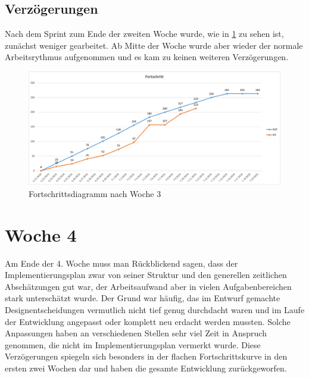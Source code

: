 \subsection{Verzögerungen}
Nach dem Sprint zum Ende der zweiten Woche wurde, wie in \ref{fig:week_three_diagram} zu sehen ist, zunächst weniger gearbeitet. Ab Mitte der Woche wurde aber wieder der normale Arbeitsrythmus aufgenommen und es kam zu keinen weiteren Verzögerungen.
\begin{figure}[!htbp]
	\centering
	\includegraphics[width=380pt]{resourcen/week_three_diagram.PNG}
	\caption{Fortschrittsdiagramm nach Woche 3}
	\label{fig:week_three_diagram}
\end{figure}
\section{Woche 4}
Am Ende der 4. Woche muss man Rückblickend sagen, dass der Implementierungsplan zwar von seiner Struktur und den generellen zeitlichen Abschätzungen gut war, der Arbeitsaufwand aber in vielen Aufgabenbereichen stark unterschätzt wurde. Der Grund war häufig, das im Entwurf gemachte Designentscheidungen vermutlich nicht tief genug durchdacht waren und im Laufe der Entwicklung angepasst oder komplett neu erdacht werden mussten. Solche Anpassungen haben an verschiedenen Stellen sehr viel Zeit in Anspruch genommen, die nicht im Implementierungsplan vermerkt wurde. Diese Verzögerungen spiegeln sich besonders in der flachen Fortschrittskurve in den ersten zwei Wochen dar und haben die gesamte Entwicklung zurückgeworfen.
